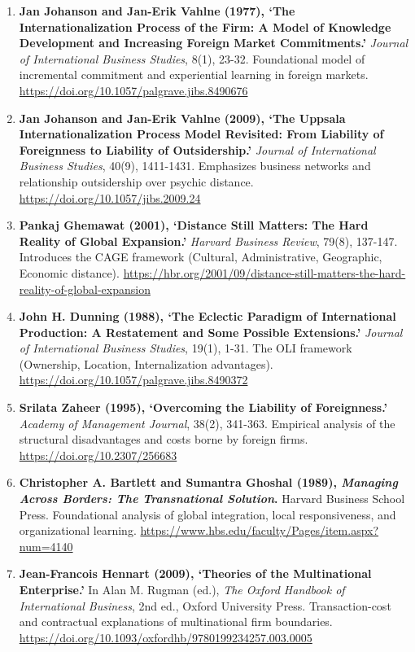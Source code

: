\begin{enumerate}
    \item \textbf{Jan Johanson and Jan-Erik Vahlne (1977), `The Internationalization Process of the Firm: A Model of Knowledge Development and Increasing Foreign Market Commitments.'} \textit{Journal of International Business Studies}, 8(1), 23-32. Foundational model of incremental commitment and experiential learning in foreign markets. \url{https://doi.org/10.1057/palgrave.jibs.8490676}
    \item \textbf{Jan Johanson and Jan-Erik Vahlne (2009), `The Uppsala Internationalization Process Model Revisited: From Liability of Foreignness to Liability of Outsidership.'} \textit{Journal of International Business Studies}, 40(9), 1411-1431. Emphasizes business networks and relationship outsidership over psychic distance. \url{https://doi.org/10.1057/jibs.2009.24}
    \item \textbf{Pankaj Ghemawat (2001), `Distance Still Matters: The Hard Reality of Global Expansion.'} \textit{Harvard Business Review}, 79(8), 137-147. Introduces the CAGE framework (Cultural, Administrative, Geographic, Economic distance). \url{https://hbr.org/2001/09/distance-still-matters-the-hard-reality-of-global-expansion}
    \item \textbf{John H. Dunning (1988), `The Eclectic Paradigm of International Production: A Restatement and Some Possible Extensions.'} \textit{Journal of International Business Studies}, 19(1), 1-31. The OLI framework (Ownership, Location, Internalization advantages). \url{https://doi.org/10.1057/palgrave.jibs.8490372}
    \item \textbf{Srilata Zaheer (1995), `Overcoming the Liability of Foreignness.'} \textit{Academy of Management Journal}, 38(2), 341-363. Empirical analysis of the structural disadvantages and costs borne by foreign firms. \url{https://doi.org/10.2307/256683}
    \item \textbf{Christopher A. Bartlett and Sumantra Ghoshal (1989), \textit{Managing Across Borders: The Transnational Solution}.} Harvard Business School Press. Foundational analysis of global integration, local responsiveness, and organizational learning. \url{https://www.hbs.edu/faculty/Pages/item.aspx?num=4140}
    \item \textbf{Jean-Francois Hennart (2009), `Theories of the Multinational Enterprise.'} In Alan M. Rugman (ed.), \textit{The Oxford Handbook of International Business}, 2nd ed., Oxford University Press. Transaction-cost and contractual explanations of multinational firm boundaries. \url{https://doi.org/10.1093/oxfordhb/9780199234257.003.0005}

\end{enumerate}
